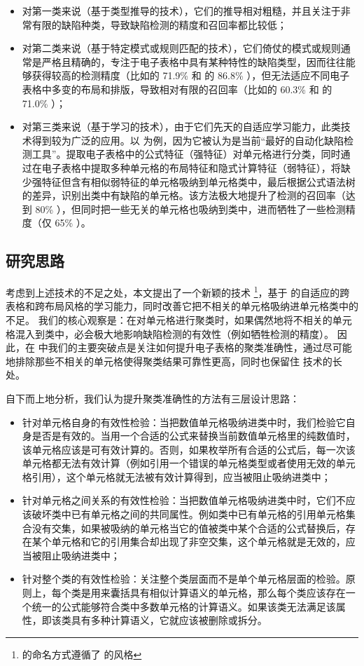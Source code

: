 \begin{itemize}
    \item 对第一类来说（基于类型推导的技术），它们的推导相对粗糙，并且关注于非常有限的缺陷种类，导致缺陷检测的精度和召回率都比较低\cite{zhang2017effectively}；
    \item 对第二类来说（基于特定模式或规则匹配的技术），它们倚仗的模式或规则通常是严格且精确的，专注于电子表格中具有某种特性的缺陷类型，因而往往能够获得较高的检测精度（比如\am 的 71.9\% 和 \ca 的 86.8\% \cite{dou2017cacheck}），但无法适应不同电子表格中多变的布局和排版，导致相对有限的召回率（比如\am 的 60.3\% 和 \ca 的 71.0\% \cite{dou2017cacheck}）；
    \item 对第三类来说（基于学习的技术），由于它们先天的自适应学习能力，此类技术得到较为广泛的应用。以 \cu \cite{cheung2016custodes} 为例，因为它被认为是当前“最好的自动化缺陷检测工具”\cite{Barowy2018excelint}。\cu 提取电子表格中的公式特征（强特征）对单元格进行分类，同时通过在电子表格中提取多种单元格的布局特征和隐式计算特征（弱特征），将缺少强特征但含有相似弱特征的单元格吸纳到单元格类中，最后根据公式语法树的差异，识别出类中有缺陷的单元格。该方法极大地提升了检测的召回率（达到 80\% \cite{cheung2016custodes}），但同时把一些无关的单元格也吸纳到类中，进而牺牲了一些检测精度（仅 65\% \cite{cheung2016custodes}）。 
\end{itemize}

\subsection{研究思路}
考虑到上述技术的不足之处，本文提出了一个新颖的技术 \wa \footnote{\wa 的命名方式遵循了 \cu 的风格}，基于 \cu 的自适应的跨表格和跨布局风格的学习能力，同时改善它把不相关的单元格吸纳进单元格类中的不足。
我们的核心观察是：在对单元格进行聚类时，如果偶然地将不相关的单元格混入到类中，必会极大地影响缺陷检测的有效性（例如牺牲检测的精度）。
因此，在 \wa 中我们的主要突破点是关注如何提升电子表格的聚类准确性，通过尽可能地排除那些不相关的单元格使得聚类结果可靠性更高，同时也保留住 \cu 技术的长处。

自下而上地分析，我们认为提升聚类准确性的方法有三层设计思路：
\begin{itemize}
    \item 针对单元格自身的有效性检验：当把数值单元格吸纳进类中时，我们检验它自身是否是有效的。当用一个合适的公式来替换当前数值单元格里的纯数值时，该单元格应该是可有效计算的。否则，如果枚举所有合适的公式后，每一次该单元格都无法有效计算（例如引用一个错误的单元格类型或者使用无效的单元格引用），这个单元格就无法被有效计算得到，应当被阻止吸纳进类中；
    \item 针对单元格之间关系的有效性检验：当把数值单元格吸纳进类中时，它们不应该破坏类中已有单元格之间的共同属性。例如类中已有单元格的引用单元格集合没有交集，如果被吸纳的单元格当它的值被类中某个合适的公式替换后，存在某个单元格和它的引用集合却出现了非空交集，这个单元格就是无效的，应当被阻止吸纳进类中；
    \item 针对整个类的有效性检验：关注整个类层面而不是单个单元格层面的检验。原则上，每个类是用来囊括具有相似计算语义的单元格，那么每个类应该存在一个统一的公式能够符合类中多数单元格的计算语义。如果该类无法满足该属性，即该类具有多种计算语义，它就应该被删除或拆分。
\end{itemize}

